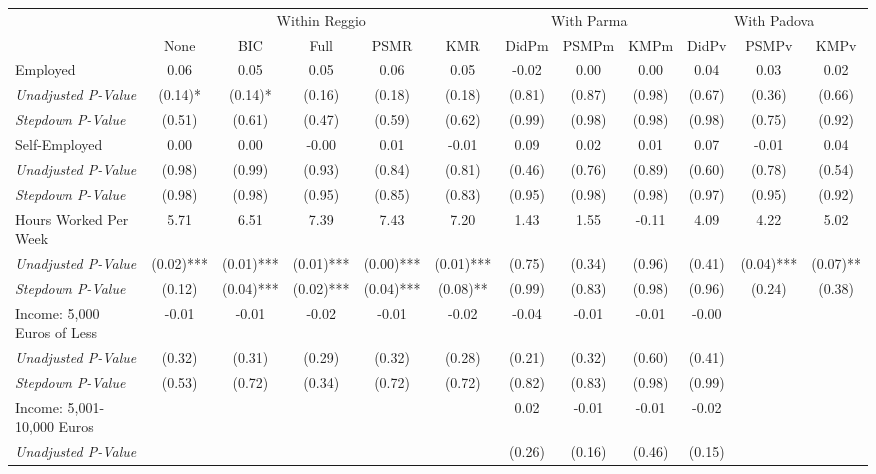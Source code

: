 \begin{tabular}{l c c c c c c c c c c c}
\toprule
& \multicolumn{5}{c}{Within Reggio} & \multicolumn{3}{c}{With Parma} & \multicolumn{3}{c}{With Padova} \\\cmidrule(lr){2-6} \cmidrule(lr){7-9} \cmidrule(lr){10-12}
 & None & BIC & Full & PSMR & KMR & DidPm & PSMPm & KMPm & DidPv & PSMPv & KMPv \\
\midrule
Employed & 0.06 & 0.05 & 0.05 & 0.06 & 0.05 & -0.02 & 0.00 & 0.00 & 0.04 & 0.03 & 0.02 \\
\quad \textit{Unadjusted P-Value} & (0.14)* & (0.14)* & (0.16) & (0.18) & (0.18) & (0.81) & (0.87) & (0.98) & (0.67) & (0.36) & (0.66) \\
\quad \textit{Stepdown P-Value} & (0.51) & (0.61) & (0.47) & (0.59) & (0.62) & (0.99) & (0.98) & (0.98) & (0.98) & (0.75) & (0.92) \\
Self-Employed & 0.00 & 0.00 & -0.00 & 0.01 & -0.01 & 0.09 & 0.02 & 0.01 & 0.07 & -0.01 & 0.04 \\
\quad \textit{Unadjusted P-Value} & (0.98) & (0.99) & (0.93) & (0.84) & (0.81) & (0.46) & (0.76) & (0.89) & (0.60) & (0.78) & (0.54) \\
\quad \textit{Stepdown P-Value} & (0.98) & (0.98) & (0.95) & (0.85) & (0.83) & (0.95) & (0.98) & (0.98) & (0.97) & (0.95) & (0.92) \\
Hours Worked Per Week & 5.71 & 6.51 & 7.39 & 7.43 & 7.20 & 1.43 & 1.55 & -0.11 & 4.09 & 4.22 & 5.02 \\
\quad \textit{Unadjusted P-Value} & (0.02)*** & (0.01)*** & (0.01)*** & (0.00)*** & (0.01)*** & (0.75) & (0.34) & (0.96) & (0.41) & (0.04)*** & (0.07)** \\
\quad \textit{Stepdown P-Value} & (0.12) & (0.04)*** & (0.02)*** & (0.04)*** & (0.08)** & (0.99) & (0.83) & (0.98) & (0.96) & (0.24) & (0.38) \\
Income: 5,000 Euros of Less & -0.01 & -0.01 & -0.02 & -0.01 & -0.02 & -0.04 & -0.01 & -0.01 & -0.00 &  &  \\
\quad \textit{Unadjusted P-Value} & (0.32) & (0.31) & (0.29) & (0.32) & (0.28) & (0.21) & (0.32) & (0.60) & (0.41) & & \\
\quad \textit{Stepdown P-Value} & (0.53) & (0.72) & (0.34) & (0.72) & (0.72) & (0.82) & (0.83) & (0.98) & (0.99) &  &  \\
Income: 5,001-10,000 Euros &  &  &  &  &  & 0.02 & -0.01 & -0.01 & -0.02 &  &  \\
\quad \textit{Unadjusted P-Value} & & & & & & (0.26) & (0.16) & (0.46) & (0.15) & & \\

\end{tabular}

